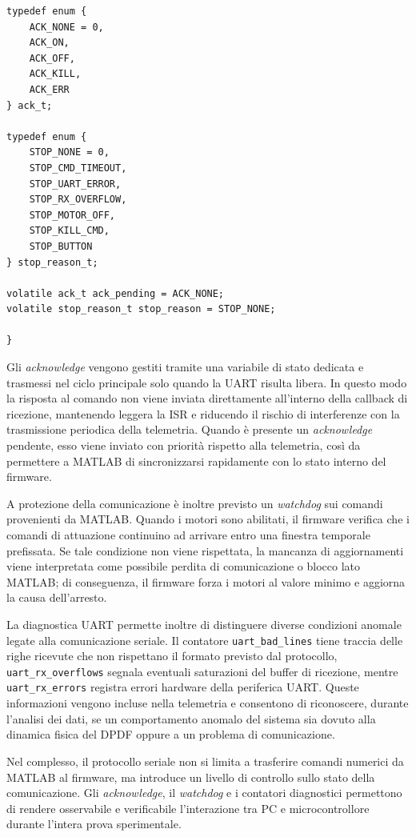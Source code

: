 \documentclass[11pt]{report}
\begin{document}
\begin{lstlisting}[caption={Enumerazioni utilizzate per gli acknowledge e per la codifica delle cause di arresto.}, label={lst:nome}]
typedef enum {
    ACK_NONE = 0,
    ACK_ON,
    ACK_OFF,
    ACK_KILL,
    ACK_ERR
} ack_t;

typedef enum {
    STOP_NONE = 0,
    STOP_CMD_TIMEOUT,
    STOP_UART_ERROR,
    STOP_RX_OVERFLOW,
    STOP_MOTOR_OFF,
    STOP_KILL_CMD,
    STOP_BUTTON
} stop_reason_t;

volatile ack_t ack_pending = ACK_NONE;
volatile stop_reason_t stop_reason = STOP_NONE;

}
\end{lstlisting}

Gli \textit{acknowledge} vengono gestiti tramite una variabile di stato dedicata e trasmessi nel ciclo principale solo quando la UART risulta libera. In questo modo la risposta al comando non viene inviata direttamente all'interno della callback di ricezione, mantenendo leggera la ISR e riducendo il rischio di interferenze con la trasmissione periodica della telemetria. Quando è presente un \textit{acknowledge} pendente, esso viene inviato con priorità rispetto alla telemetria, così da permettere a MATLAB di sincronizzarsi rapidamente con lo stato interno del firmware.

A protezione della comunicazione è inoltre previsto un \textit{watchdog} sui comandi provenienti da MATLAB. Quando i motori sono abilitati, il firmware verifica che i comandi di attuazione continuino ad arrivare entro una finestra temporale prefissata. Se tale condizione non viene rispettata, la mancanza di aggiornamenti viene interpretata come possibile perdita di comunicazione o blocco lato MATLAB; di conseguenza, il firmware forza i motori al valore minimo e aggiorna la causa dell'arresto.

La diagnostica UART permette inoltre di distinguere diverse condizioni anomale legate alla comunicazione seriale. Il contatore \texttt{uart\_bad\_lines} tiene traccia delle righe ricevute che non rispettano il formato previsto dal protocollo, \texttt{uart\_rx\_overflows} segnala eventuali saturazioni del buffer di ricezione, mentre \texttt{uart\_rx\_errors} registra errori hardware della periferica UART. Queste informazioni vengono incluse nella telemetria e consentono di riconoscere, durante l'analisi dei dati, se un comportamento anomalo del sistema sia dovuto alla dinamica fisica del DPDF oppure a un problema di comunicazione.

Nel complesso, il protocollo seriale non si limita a trasferire comandi numerici da MATLAB al firmware, ma introduce un livello di controllo sullo stato della comunicazione. Gli \textit{acknowledge}, il \textit{watchdog} e i contatori diagnostici permettono di rendere osservabile e verificabile l'interazione tra PC e microcontrollore durante l'intera prova sperimentale.
\end{document}

